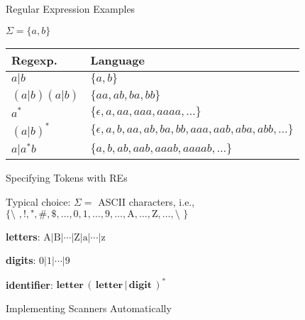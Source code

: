 \documentclass{plt}
\begin{document}
\begin{frame}{Regular Expression Examples}

$\Sigma = \{ a, b \}$

\begin{tabular}{ll}
\toprule
\textbf{Regexp.} & \textbf{Language} \\
\midrule
$a | b$ & $\{ a, b \}$ \\
$(a|b)(a|b)$ & $\{ aa, ab, ba, bb \}$ \\
$a^*$ & $\{ \epsilon, a, aa, aaa, aaaa, \ldots \}$ \\
$(a|b)^*$ & $\{ \epsilon, a, b, aa, ab, ba, bb, aaa, aab, aba, abb,
\ldots \}$ \\
$a | a^*b$ & $\{ a, b, ab, aab, aaab, aaaab, \ldots \}$ \\
\bottomrule
\end{tabular}

\end{frame}

\begin{frame}{Specifying Tokens with REs}

Typical choice: $\Sigma = $ ASCII characters, i.e., $\{
\texttt{\char`\ }, !, \texttt{"}, \#, \$, \ldots, \textrm{0},
\textrm{1}, \ldots, \textrm{9},
\ldots, \textrm{A}, \ldots, \textrm{Z}, \ldots, \texttt{\char`\~} \}$

\textbf{letters}: $\textrm{A} | \textrm{B} | \cdots | \textrm{Z} |
\textrm{a} | \cdots | \textrm{z}$

\textbf{digits}: $\textrm{0} | \textrm{1} | \cdots | \textrm{9}$

\textbf{identifier}: $\textbf{letter}\, (\, \textbf{letter}\, | \,
\textbf{digit}\, )^*$

\end{frame}

\begin{frame}{Implementing Scanners Automatically}

\begin{center}
\end{center}

\end{frame}
\end{document}
